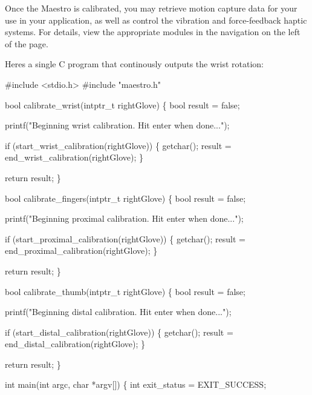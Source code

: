 Once the Maestro is calibrated, you may retrieve motion capture data for your use in your application, as well as control the vibration and force-\/feedback haptic systems. For details, view the appropriate modules in the navigation on the left of the page.

Here\textquotesingle{}s a single C program that continously outputs the wrist rotation\+:


\begin{DoxyCode}
\textcolor{preprocessor}{#include <stdio.h>}
\textcolor{preprocessor}{#include "maestro.h"}

\textcolor{keywordtype}{bool} calibrate\_wrist(intptr\_t rightGlove)
\{
    \textcolor{keywordtype}{bool} result = \textcolor{keyword}{false};

    printf(\textcolor{stringliteral}{"Beginning wrist calibration. Hit enter when done..."});

    \textcolor{keywordflow}{if} (start\_wrist\_calibration(rightGlove)) \{
        getchar();
        result = end\_wrist\_calibration(rightGlove);
    \}

    \textcolor{keywordflow}{return} result;
\}

\textcolor{keywordtype}{bool} calibrate\_fingers(intptr\_t rightGlove)
\{
    \textcolor{keywordtype}{bool} result = \textcolor{keyword}{false};

    printf(\textcolor{stringliteral}{"Beginning proximal calibration. Hit enter when done..."});

    \textcolor{keywordflow}{if} (start\_proximal\_calibration(rightGlove)) \{
        getchar();
        result = end\_proximal\_calibration(rightGlove);
    \}

    \textcolor{keywordflow}{return} result;
\}

\textcolor{keywordtype}{bool} calibrate\_thumb(intptr\_t rightGlove)
\{
    \textcolor{keywordtype}{bool} result = \textcolor{keyword}{false};

    printf(\textcolor{stringliteral}{"Beginning distal calibration. Hit enter when done..."});

    \textcolor{keywordflow}{if} (start\_distal\_calibration(rightGlove)) \{
        getchar();
        result = end\_distal\_calibration(rightGlove);
    \}

    \textcolor{keywordflow}{return} result;
\}

\textcolor{keywordtype}{int} main(\textcolor{keywordtype}{int} argc, \textcolor{keywordtype}{char} *argv[])
\{
    \textcolor{keywordtype}{int} exit\_status = EXIT\_SUCCESS;


\end{DoxyCode}
